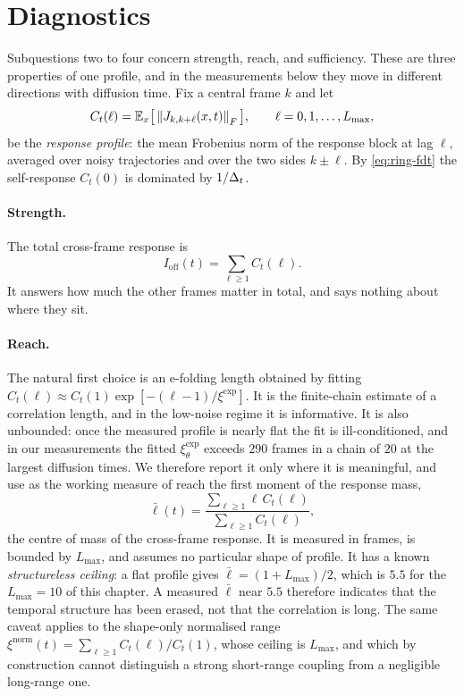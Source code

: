 \section{Diagnostics}\label{sec:ring-diagnostics}

Subquestions two to four concern strength, reach, and sufficiency. These are
three properties of one profile, and in the measurements below they move in
different directions with diffusion time. Fix a central frame $k$ and let
\begin{equation}
  C_t(\ell) = \mathbb{E}_x\big[ \left\lVert J_{k,k+\ell}(x,t) \right\rVert_F \big] ,
  \qquad \ell = 0, 1, \dots, L_{\max} ,
  \label{eq:ring-profile}
\end{equation}
be the \emph{response profile}: the mean Frobenius norm of the response block
at lag $\ell$, averaged over noisy trajectories and over the two sides
$k \pm \ell$. By \eqref{eq:ring-fdt} the self-response $C_t(0)$ is dominated by
$1/\Delta_t$.

\paragraph{Strength.} The total cross-frame response is
\begin{equation}
  I_{\mathrm{off}}(t) = \sum_{\ell \ge 1} C_t(\ell) .
  \label{eq:ring-intensity}
\end{equation}
It answers how much the other frames matter in total, and says nothing about
where they sit.

\paragraph{Reach.} The natural first choice is an e-folding length obtained by
fitting $C_t(\ell) \approx C_t(1)\exp[-(\ell-1)/\xi^{\mathrm{exp}}]$. It is the
finite-chain estimate of a correlation length, and in the low-noise regime it
is informative. It is also unbounded: once the measured profile is nearly flat
the fit is ill-conditioned, and in our measurements the fitted
$\xi^{\mathrm{exp}}_\theta$ exceeds $290$ frames in a chain of $20$ at the
largest diffusion times. We therefore report it only where it is meaningful,
and use as the working measure of reach the first moment of the response mass,
\begin{equation}
  \bar\ell(t)
  = \frac{\sum_{\ell \ge 1} \ell\, C_t(\ell)}{\sum_{\ell \ge 1} C_t(\ell)} ,
  \label{eq:ring-mean-lag}
\end{equation}
the centre of mass of the cross-frame response. It is measured in frames, is
bounded by $L_{\max}$, and assumes no particular shape of profile. It has a
known \emph{structureless ceiling}: a flat profile gives
$\bar\ell = (1 + L_{\max})/2$, which is $5.5$ for the $L_{\max} = 10$ of this
chapter. A measured $\bar\ell$ near $5.5$ therefore indicates that the temporal
structure has been erased, not that the correlation is long. The same caveat
applies to the shape-only normalised range
$\xi^{\mathrm{norm}}(t) = \sum_{\ell\ge1} C_t(\ell)/C_t(1)$, whose ceiling is
$L_{\max}$, and which by construction cannot distinguish a strong short-range
coupling from a negligible long-range one.


